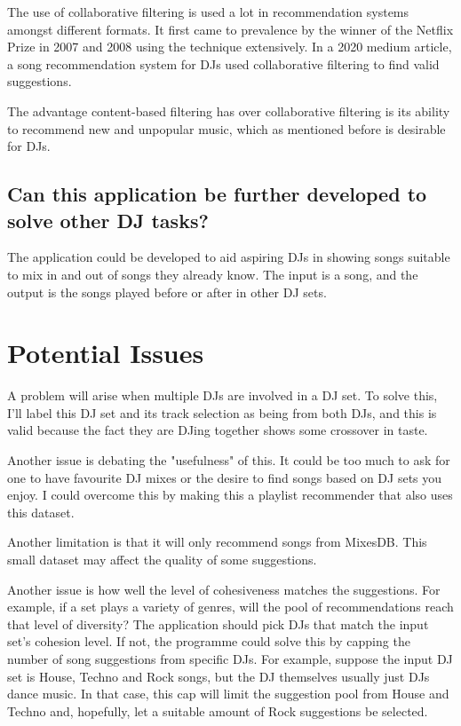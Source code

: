 \documentclass[]{article}
\begin{document}
	The use of collaborative filtering is used a lot in recommendation systems amongst different formats. It first came to prevalence by the winner of the Netflix Prize in 2007 and 2008 using the technique extensively. In a 2020 medium article, a song recommendation system for DJs used collaborative filtering to find valid suggestions.
	
	\begin{flushleft}
		The advantage content-based filtering has over collaborative filtering is its ability to recommend new and unpopular music, which as mentioned before is desirable for DJs.
	\end{flushleft}
	
	
	\subsection{Can this application be further developed to solve other DJ tasks?}
	The application could be developed to aid aspiring DJs in showing songs suitable to mix in and out of songs they already know. The input is a song, and the output is the songs played before or after in other DJ sets.
	
\section{Potential Issues}
A problem will arise when multiple DJs are involved in a DJ set. To solve this, I'll label this DJ set and its track selection as being from both DJs, and this is valid because the fact they are DJing together shows some crossover in taste.

\begin{flushleft}
	Another issue is debating the "usefulness" of this. It could be too much to ask for one to have favourite DJ mixes or the desire to find songs based on DJ sets you enjoy. I could overcome this by making this a playlist recommender that also uses this dataset. 
	
\end{flushleft}

\begin{flushleft}
	Another limitation is that it will only recommend songs from MixesDB. This small dataset may affect the quality of some suggestions.
\end{flushleft}

\begin{flushleft}
	Another issue is how well the level of cohesiveness matches the suggestions. For example, if a set plays a variety of genres, will the pool of recommendations reach that level of diversity? The application should pick DJs that match the input set's cohesion level. If not, the programme could solve this by capping the number of song suggestions from specific DJs. For example, suppose the input DJ set is House, Techno and Rock songs, but the DJ themselves usually just DJs dance music. In that case, this cap will limit the suggestion pool from House and Techno and, hopefully, let a suitable amount of Rock suggestions be selected. 
\end{flushleft}
\end{document}
